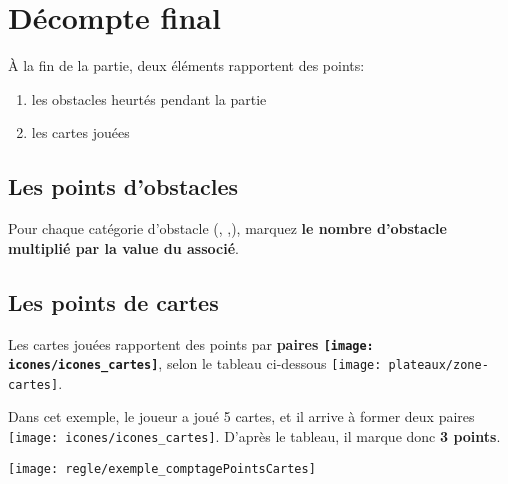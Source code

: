 \section*{Décompte final} \label{sec:comptagePoints}
À la fin de la partie, deux éléments rapportent des points:
\begin{enumerate}
\item les obstacles heurtés pendant la partie
\item les cartes jouées
\end{enumerate}

\subsection*{Les points d'obstacles} \label{sec:pointsObstacles}
Pour chaque catégorie d'obstacle (\arbre, \tronc,\rocher), marquez \textbf{le nombre d'obstacle multiplié par la value du \marqueurObstacle associé}.

\FloatBarrier


\subsection*{Les points de cartes} \label{sec:pointsCarte}
Les cartes jouées rapportent des points par \textbf{paires \texttt{[image: icones/icones\_cartes]}}, selon le tableau ci-dessous
\texttt{[image: plateaux/zone-cartes]}.

{    \begin{multicols}{2}
    Dans cet exemple, le joueur \vent a joué 5 cartes, et il arrive à former deux paires \texttt{[image: icones/icones\_cartes]}. D'après le tableau, il marque donc \textbf{3 points}.
    
    \columnbreak
	\texttt{[image: regle/exemple\_comptagePointsCartes]}
    \end{multicols}
}
\FloatBarrier